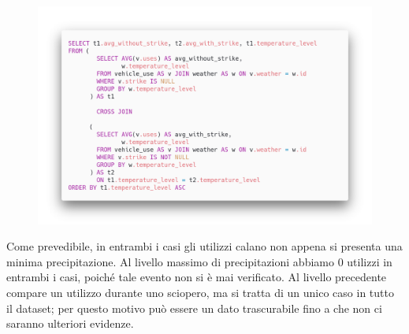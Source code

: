 \begin{figure}[H]                                                                                                                                                            
\centering                                                                                                                                                                   
\includegraphics[width=\textwidth]{images/query4}                                                                                                                                   
\label{fig:query4}                                                                                                                                                           
\end{figure}

Come prevedibile, in entrambi i casi gli utilizzi calano non appena si presenta una minima precipitazione.
Al livello massimo di precipitazioni abbiamo 0 utilizzi in entrambi i casi, poiché tale evento non si è mai verificato.
Al livello precedente compare un utilizzo durante uno sciopero, ma si tratta di un unico caso in tutto il dataset; per questo motivo può essere
un dato trascurabile fino a che non ci saranno ulteriori evidenze.

